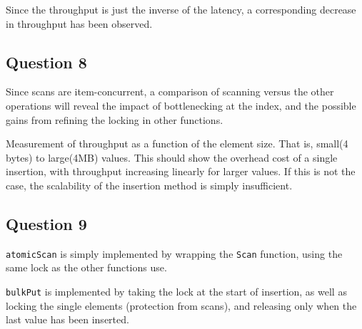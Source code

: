 \documentclass[11pt,a4paper]{article}
\begin{document}
Since the throughput is just the inverse of the latency, a corresponding decrease
in throughput has been observed.


\subsection{Question 8}
Since scans are item-concurrent, a comparison of scanning versus the other operations
will reveal the impact of bottlenecking at the index, and the possible gains from refining the
locking in other functions.

Measurement of throughput as a function of the element size. That is, small(4 bytes) to large(4MB)
values. This should show the overhead cost of a single insertion, with throughput increasing
linearly for larger values. If this is not the case, the scalability of the insertion method
is simply insufficient.


\subsection{Question 9}
{\tt atomicScan} is simply implemented by wrapping the {\tt Scan} function,
using the same lock as the other functions use.

{\tt bulkPut} is implemented by taking the lock at the start of insertion, as
well as locking the single elements (protection from scans), and releasing only
when the last value has been inserted.
\end{document}
